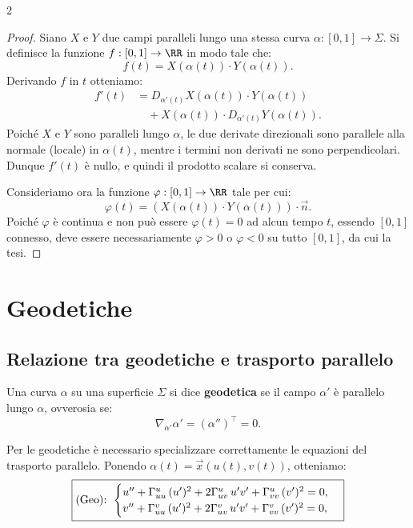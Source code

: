 \begin{multicols*}{2}
    \begin{proof}
        Siano $X$ e $Y$ due campi paralleli lungo una stessa curva $\alpha : [0, 1] \to \Sigma$.
        Si definisce la funzione $f : [0, 1] \to \RR$ in modo tale che:
        \[
            f(t) = X(\alpha(t)) \cdot Y(\alpha(t)).
        \]
        Derivando $f$ in $t$ otteniamo:
        \begin{align*}
            f'(t) & = D_{\alpha'(t)} X(\alpha(t)) \cdot Y(\alpha(t))        \\
                  & \quad + X(\alpha(t)) \cdot D_{\alpha'(t)} Y(\alpha(t)).
        \end{align*}
        Poiché $X$ e $Y$ sono paralleli lungo $\alpha$, le due derivate direzionali sono
        parallele alla normale (locale) in $\alpha(t)$, mentre i termini non derivati
        ne sono perpendicolari. Dunque $f'(t)$ è nullo, e quindi il prodotto scalare si conserva. \smallskip

        Consideriamo ora la funzione $\varphi : [0, 1] \to \RR$ tale per cui:
        \[
            \varphi(t) = (X(\alpha(t)) \cdot Y(\alpha(t))) \cdot \vec{n}.
        \]
        Poiché $\varphi$ è continua e non può essere $\varphi(t) = 0$ ad alcun tempo $t$,
        essendo $[0, 1]$ connesso, deve essere necessariamente $\varphi > 0$ o
        $\varphi < 0$ su tutto $[0, 1]$, da cui la tesi.
    \end{proof}

    \section{Geodetiche}

    \subsection{Relazione tra geodetiche e trasporto parallelo}

    \begin{definition}
        Una curva $\alpha$ su una superficie $\Sigma$ si dice
        \textbf{geodetica} se il campo $\alpha'$ è parallelo lungo
        $\alpha$, ovverosia se:
        \[
            \boxed{\nabla_{\alpha'} \alpha' = (\alpha'')^\top = 0.}
        \]
    \end{definition}

    \begin{remark}
        Per le geodetiche è necessario specializzare correttamente
        le equazioni del trasporto parallelo. Ponendo
        $\alpha(t) = \vec{x}(u(t), v(t))$, otteniamo:
        \begin{equation*} \label{eq:Geo}
            \boxed{\textnormal{(Geo):  } \begin{cases}
                    u'' + \Gamma_{uu}^u \, (u')^2 + 2 \Gamma_{uv}^u \, u'v' + \Gamma_{vv}^u \, (v')^2 = 0, \\
                    v'' + \Gamma_{uu}^v \, (u')^2 + 2 \Gamma_{uv}^v \, u'v' + \Gamma_{vv}^v \, (v')^2 = 0,
                \end{cases}}
        \end{equation*}
    \end{remark}


\end{multicols*}
